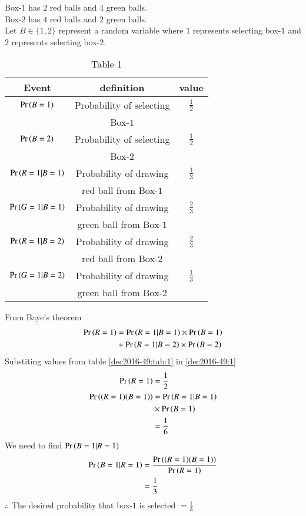 Box-$1$ has $2$ red balls and $4$ green balls.\\
Box-$2$ has $4$ red balls and $2$ green balls.\\
Let $B \in \{1,2\} $ represent a random variable where $1$ represents selecting box-$1$ and $2$ represents selecting box-$2$.
\begin{table}[h!]
\resizebox{\columnwidth}{!}
{ 
\begin{tabular}{|c|c|c|}
\hline
Event & definition & value\\
\hline
$ \Pr\left(B=1\right) $ & Probability of selecting  & $\frac{1}{2}$\\
&Box-$1$ & \\
\hline
$ \Pr\left(B=2\right) $ & Probability of selecting & $\frac{1}{2}$ \\
& Box-$2$& \\
\hline
$\Pr\left(R=1|B=1\right)$ & Probability of drawing &  $\frac{1}{3}$   \\
&  red ball from Box-$1$ &\\
\hline
$\Pr\left(G=1|B=1\right)$ & Probability of drawing &  $\frac{2}{3}$   \\
&  green ball from Box-$1$ &\\
\hline
$\Pr\left(R=1|B=2\right)$ & Probability of drawing &  $\frac{2}{3}$   \\
&  red ball from Box-$2$ &\\
\hline
$\Pr\left(G=1|B=2\right)$ & Probability of drawing &  $\frac{1}{3}$   \\
&  green ball from Box-$2$ &\\
\hline
\end{tabular}
}
\caption{Table 1} 
\label{dec2016-49:tab:1}
\end{table}
From Baye's theorem
\begin{align}
\Pr\left(R=1\right)&=\Pr\left(R=1|B=1\right) \times \Pr\left(B=1\right) \notag \\
 & +\Pr\left(R=1|B=2\right) \times \Pr\left(B=2\right)  \label{dec2016-49:1}
 \end{align}
Substiting values from table \eqref{dec2016-49:tab:1} in \eqref{dec2016-49:1}
\begin{align}
\Pr\left(R=1\right) &=\frac{1}{2} \label{dec2016-49:2} \\
\Pr\left((R=1)(B=1)\right)&=\Pr\left(R=1|B=1\right)\notag \\
&  \times \Pr\left(B=1\right) \\ 
&= \frac{1}{6}  \label{dec2016-49:3}
\end{align}
We need to find $\Pr\left(B=1|R=1\right)$ \\
\begin{align}
\Pr\left(B=1|R=1\right) &= \frac{\Pr\left((R=1 ) (B=1)\right)}{\Pr\left(R=1\right)} \\
&=\frac{1}{3}
\end{align}
 $\therefore$ The desired probability that box-$1$ is selected $= \frac{1}{3}$ \\
 